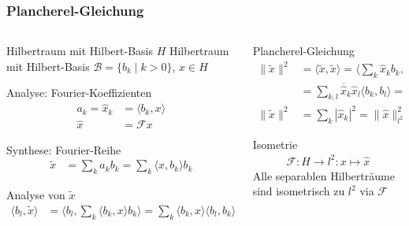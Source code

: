 %
%
%
\bgroup
\begin{frame}[t]
\setlength{\abovedisplayskip}{5pt}
\setlength{\belowdisplayskip}{5pt}
\frametitle{Plancherel-Gleichung}
\vspace{-20pt}
\begin{columns}[t,onlytextwidth]
\begin{column}{0.48\textwidth}
\begin{block}{Hilbertraum mit Hilbert-Basis}
$H$ Hilbertraum mit Hilbert-Basis
$\mathcal{B}=\{b_k\;|\; k>0\}$, $x\in H$
\end{block}
\begin{block}{Analyse: Fourier-Koeffizienten}
\begin{align*}
a_k = \hat{x}_k &=\langle b_k, x\rangle
\\
\hat{x}&=\mathcal{F}x
\end{align*}
\end{block}
\vspace{-10pt}
\begin{block}{Synthese: Fourier-Reihe}
\begin{align*}
\tilde{x}
&=
\sum_k a_k b_k
=
\sum_k \langle x,b_k\rangle b_k
\end{align*}
\end{block}
\vspace{-6pt}
\begin{block}{Analyse von $\tilde{x}$}
\begin{align*}
\langle b_l,\tilde{x}\rangle
&=
\biggl\langle
b_l,\sum_{k}\langle b_k,x\rangle b_k
\biggr\rangle
=
\sum_k \langle b_k,x\rangle\langle b_l,b_k\rangle
=
\sum_k \langle b_k,x\rangle\delta_{kl}
=
\langle b_l,x\rangle
=
\hat{x}_l
\end{align*}
\end{block}
\end{column}
\begin{column}{0.48\textwidth}
\begin{block}{Plancherel-Gleichung}
\begin{align*}
\|\tilde{x}\|^2
&=
\langle \tilde{x},\tilde{x}\rangle
=
\biggl\langle
\sum_k \hat{x}_kb_k,
\sum_l \hat{x}_lb_l
\biggr\rangle
\\
&=
\sum_{k,l} \overline{\hat{x}}_k\hat{x}_l\langle b_k,b_l\rangle
=
\sum_{k,l} \overline{\hat{x}}_k\hat{x}_l\delta_{kl}
\\
\|\tilde{x}\|^2
&=
\sum_k |\hat{x}_k|^2
=
\|\hat{x}\|_{l^2}^2
=
\|\mathcal{F}x\|_{l^2}^2
\end{align*}
\end{block}
\vspace{-12pt}
\begin{block}{Isometrie}
\begin{align*}
\mathcal{F}
\colon
H \to l^2
\colon
x\mapsto \hat{x}
\end{align*}
Alle separablen Hilberträume sind isometrisch zu $l^2$ via
$\mathcal{F}$
\end{block}
\end{column}
\end{columns}
\end{frame}
\egroup
